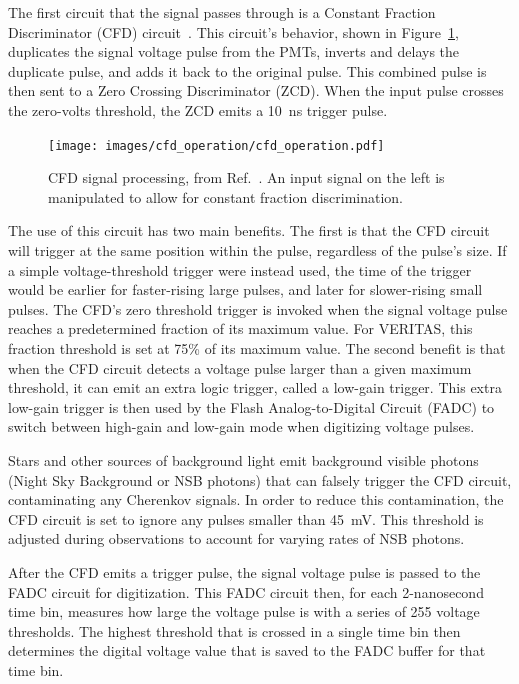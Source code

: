 The first circuit that the signal passes through is a Constant Fraction Discriminator (CFD) circuit~\cite{cfd_behavior}.
This circuit's behavior, shown in Figure~\ref{fig:cfd_operation}, duplicates the signal voltage pulse from the PMTs, inverts and delays the duplicate pulse, and adds it back to the original pulse.
This combined pulse is then sent to a Zero Crossing Discriminator (ZCD).
When the input pulse crosses the zero-volts threshold, the ZCD emits a \SI{10}{ns} trigger pulse.

\begin{figure}[ht]
  \centering
  \texttt{[image: images/cfd\_operation/cfd\_operation.pdf]}
  \caption[CFD Operation]{
    CFD signal processing, from Ref.~\cite{cfd_operation}.
    An input signal on the left is manipulated to allow for constant fraction discrimination.
  }
  \label{fig:cfd_operation}
\end{figure}

The use of this circuit has two main benefits.
The first is that the CFD circuit will trigger at the same position within the pulse, regardless of the pulse's size.
If a simple voltage-threshold trigger were instead used, the time of the trigger would be earlier for faster-rising large pulses, and later for slower-rising small pulses.
The CFD's zero threshold trigger is invoked when the signal voltage pulse reaches a predetermined fraction of its maximum value.
For VERITAS, this fraction threshold is set at 75\% of its maximum value.
The second benefit is that when the CFD circuit detects a voltage pulse larger than a given maximum threshold, it can emit an extra logic trigger, called a low-gain trigger.
This extra low-gain trigger is then used by the Flash Analog-to-Digital Circuit (FADC) to switch between high-gain and low-gain mode when digitizing voltage pulses.

Stars and other sources of background light emit background visible photons (Night Sky Background or NSB photons) that can falsely trigger the CFD circuit, contaminating any Cherenkov signals.
In order to reduce this contamination, the CFD circuit is set to ignore any pulses smaller than \SI{45}{mV}.
This threshold is adjusted during observations to account for varying rates of NSB photons.

After the CFD emits a trigger pulse, the signal voltage pulse is passed to the FADC circuit for digitization.
This FADC circuit then, for each 2-nanosecond time bin, measures how large the voltage pulse is with a series of 255 voltage thresholds.
The highest threshold that is crossed in a single time bin then determines the digital voltage value that is saved to the FADC buffer for that time bin.

